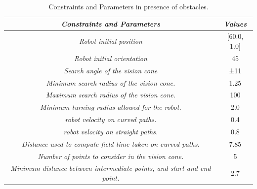 \begin{table}[]
    \centering
    \caption{Constraints and Parameters in presence of obstacles.}
    \label{tab:constraints_and_parameters_obs}
    \begin{tabular}{|c|c|}
    \hline
    \rowcolor[HTML]{FFCC67} 
    \textit{\textbf{Constraints and Parameters}}                                    & \textit{\textbf{Values}}       \\ \hline
    \rowcolor[HTML]{CBF9FC} 
    \textit{Robot initial position}                                                 & {[}60.0, 1.0{]}                \\ \hline
    \rowcolor[HTML]{CBF9FC} 
    \textit{Robot initial orientation}                                              & 45                             \\ \hline
    \rowcolor[HTML]{CBF9FC} 
    \textit{Search angle of the vision cone}                                        & ±11                            \\ \hline
    \rowcolor[HTML]{CBF9FC} 
    \textit{Minimum search radius of the vision cone.}                              & 1.25                           \\ \hline
    \rowcolor[HTML]{CBF9FC} 
    \textit{Maximum search radius of the vision cone.}                              & 100                            \\ \hline
    \rowcolor[HTML]{CBF9FC} 
    \textit{Minimum turning radius allowed for the robot.}                          & 2.0                            \\ \hline
    \rowcolor[HTML]{CBF9FC} 
    \textit{robot velocity on curved paths.}                                        & 0.4                            \\ \hline
    \rowcolor[HTML]{CBF9FC} 
    \textit{robot velocity on straight paths.}                                      & 0.8                            \\ \hline
    \rowcolor[HTML]{CBF9FC} 
    \textit{Distance used to compute field time taken on curved paths.}             & 7.85                           \\ \hline
    \rowcolor[HTML]{CBF9FC} 
    \textit{Number of points to consider in the vision cone.}                       & 5                              \\ \hline
    \rowcolor[HTML]{CBF9FC} 
    \textit{Minimum distance between intermediate points, and start and end point.} & 2.7                            \\ \hline

\end{tabular}
\end{table}
